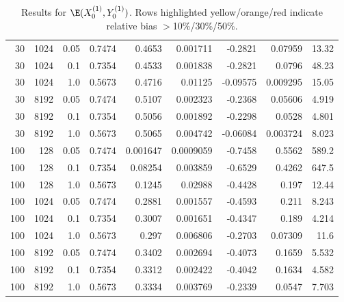 \documentclass{article}
\begin{document}
\begin{table}[htbp]
\begin{tabular}{rrr|rrrrrr}
\midrule
\rowcolor{orange!50}30 & 1024 & 0.05 & 0.7474 & 0.4653 & 0.001711 & -0.2821 & 0.07959 & 13.32 \\
\rowcolor{orange!50}30 & 1024 & 0.1 & 0.7354 & 0.4533 & 0.001838 & -0.2821 & 0.0796 & 48.23 \\
\rowcolor{yellow!40}30 & 1024 & 1.0 & 0.5673 & 0.4716 & 0.01125 & -0.09575 & 0.009295 & 15.05 \\
\midrule
\rowcolor{orange!50}30 & 8192 & 0.05 & 0.7474 & 0.5107 & 0.002323 & -0.2368 & 0.05606 & 4.919 \\
\rowcolor{orange!50}30 & 8192 & 0.1 & 0.7354 & 0.5056 & 0.001892 & -0.2298 & 0.0528 & 4.801 \\
\rowcolor{yellow!40}30 & 8192 & 1.0 & 0.5673 & 0.5065 & 0.004742 & -0.06084 & 0.003724 & 8.023 \\
\midrule
\rowcolor{red!40}100 & 128 & 0.05 & 0.7474 & 0.001647 & 0.0009059 & -0.7458 & 0.5562 & 589.2 \\
\rowcolor{red!40}100 & 128 & 0.1 & 0.7354 & 0.08254 & 0.003859 & -0.6529 & 0.4262 & 647.5 \\
\rowcolor{red!40}100 & 128 & 1.0 & 0.5673 & 0.1245 & 0.02988 & -0.4428 & 0.197 & 12.44 \\
\midrule
\rowcolor{red!40}100 & 1024 & 0.05 & 0.7474 & 0.2881 & 0.001557 & -0.4593 & 0.211 & 8.243 \\
\rowcolor{red!40}100 & 1024 & 0.1 & 0.7354 & 0.3007 & 0.001651 & -0.4347 & 0.189 & 4.214 \\
\rowcolor{orange!50}100 & 1024 & 1.0 & 0.5673 & 0.297 & 0.006806 & -0.2703 & 0.07309 & 11.6 \\
\midrule
\rowcolor{red!40}100 & 8192 & 0.05 & 0.7474 & 0.3402 & 0.002694 & -0.4073 & 0.1659 & 5.532 \\
\rowcolor{red!40}100 & 8192 & 0.1 & 0.7354 & 0.3312 & 0.002422 & -0.4042 & 0.1634 & 4.582 \\
\rowcolor{orange!50}100 & 8192 & 1.0 & 0.5673 & 0.3334 & 0.003769 & -0.2339 & 0.0547 & 7.703 \\
\bottomrule
\end{tabular}
\caption{Results for $\E(X_0^{(1)}, Y_0^{(1)})$. Rows highlighted yellow/orange/red indicate relative bias $>$10\%/30\%/50\%.}
\label{tab:x0y0}
\end{table}
\end{document}
